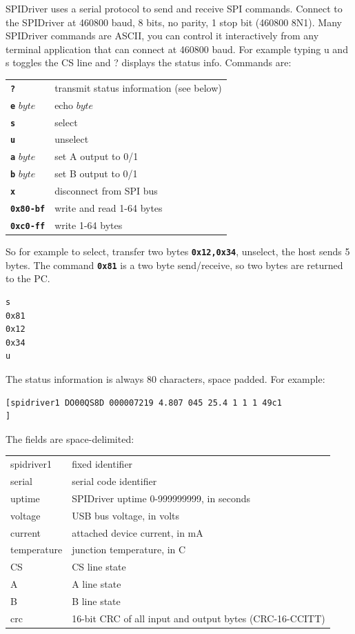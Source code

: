 \documentclass{article}
\newcommand{\mach}[1]{\texttt{\textbf{#1}}}
\newcommand{\gap}{\vspace{10pt}}
\begin{document}
SPIDriver uses a serial protocol to send and receive SPI commands.
Connect to the SPIDriver at 460800 baud, 8 bits, no parity, 1 stop bit (460800 8N1).
Many SPIDriver commands are ASCII, you can control it
interactively from any terminal application that can connect at 460800
baud. For example typing u and s toggles the CS line and ? displays the
status info.
Commands are:

\gap\begin{tabular}{ll}
\hline
\mach{?}        & transmit status information (see below)        \\
\mach{e} $byte$ & echo $byte$       \\
\mach{s}        & select        \\
\mach{u}        & unselect        \\
\mach{a} $byte$ & set A output to 0/1       \\
\mach{b} $byte$ & set B output to 0/1       \\
\mach{x}        & disconnect from SPI bus       \\
\mach{0x80-bf}  & write and read 1-64 bytes       \\
\mach{0xc0-ff}  & write 1-64 bytes        \\ \hline
\end{tabular}\gap

So for example to select, transfer two bytes
\mach{0x12,0x34},
unselect, the host sends 5 bytes.
The command \mach{0x81} is a two byte send/receive, so two bytes are returned to the PC.

\begin{lstlisting}
s
0x81
0x12
0x34
u
\end{lstlisting}


The status information is always 80 characters, space padded. For example:

{\scriptsize
\begin{framed}\begin{Verbatim}
[spidriver1 DO00QS8D 000007219 4.807 045 25.4 1 1 1 49c1                       ]
\end{Verbatim}
\end{framed}}

The fields are space-delimited:

\gap\begin{tabular}{ll}
\hline
spidriver1      & fixed identifier \\
serial          & serial code identifier \\
uptime          & SPIDriver uptime 0-999999999, in seconds \\
voltage         & USB bus voltage, in volts \\
current         & attached device current, in mA \\
temperature     & junction temperature, in C \\
CS              & CS line state \\
A               & A line state \\
B               & B line state \\
crc             & 16-bit CRC of all input and output bytes (CRC-16-CCITT) \\
\hline
\end{tabular}\gap
\end{document}
